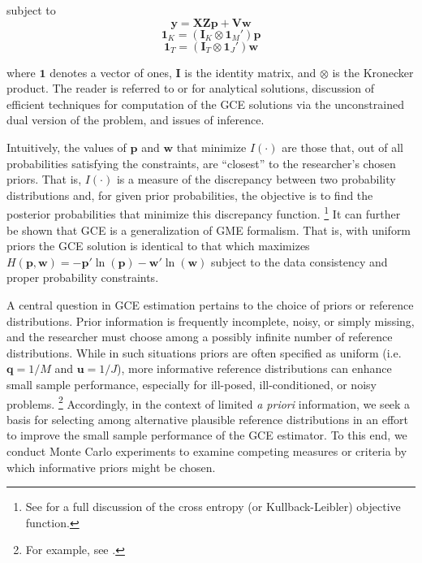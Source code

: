 \documentclass[english]{article}
\begin{document}
\noindent
subject to
\begin{equation}
\mathbf{y} = \mathbf{X Z p} 
+ \mathbf{V w}
\label{eq: glm}
\end{equation}
\begin{equation}
\mathbf{1}_K = (\mathbf{I}_K \otimes \mathbf{1}_M')\mathbf{p}
\label{eq: pp1}
\end{equation}
\begin{equation}
\mathbf{1}_T = (\mathbf{I}_T \otimes \mathbf{1}_J')\mathbf{w}
\label{eq: pp2}
\end{equation}

\noindent
where $\mathbf{1}$ denotes a vector of ones, $\mathbf{I}$ is the 
identity matrix, and $\otimes$ is the Kronecker product.
The reader is referred to \citet[Chap.\ 6]{golan1996} or 
\citet[Chap.\ 6]{golan2008} for analytical solutions, discussion of 
efficient techniques for computation of the GCE solutions via the 
unconstrained dual version of the problem, and issues of inference. 

Intuitively, the values of $\mathbf{p}$ and $\mathbf{w}$ that minimize
$I(\cdot)$ are those that, out of all probabilities satisfying the constraints, 
are ``closest'' to the researcher's chosen priors.
That is, $I(\cdot)$ is a measure of the discrepancy between two probability 
distributions and, for given prior probabilities, the objective is to find the 
posterior probabilities that minimize this discrepancy function.%
\footnote{See \citet[Chap.\ 6]{judge2011} for a full discussion of the 
cross entropy (or Kullback-Leibler) objective function.}
It can further be shown that GCE is a generalization of GME formalism.
That is, with uniform priors the GCE solution is identical to that which 
maximizes $H(\mathbf{p},\mathbf{w}) = - \mathbf{p}' \ln 
(\mathbf{p}) - \mathbf{w}' \ln (\mathbf{w})$ subject to the data
consistency and proper probability constraints. 

A central question in GCE estimation pertains to the choice of 
priors or reference distributions.
Prior information is frequently incomplete, noisy, or simply missing, and 
the researcher must choose among a possibly infinite number of 
reference distributions. 
While in such situations priors are often specified as uniform (i.e.\ 
$\mathbf{q}=1/M$ and $\mathbf{u}=1/J$), more informative 
reference distributions can enhance small sample performance, especially 
for ill-posed, ill-conditioned, or noisy problems.%
\footnote{For example, see \citet{heckelei2003}.}
Accordingly, in the context of limited \textit{a priori} information, 
we seek a basis for selecting among alternative plausible reference 
distributions in an effort to improve the small sample performance of 
the GCE estimator. 
To this end, we conduct Monte Carlo experiments to examine competing
measures or criteria by which informative priors might be chosen.
\end{document}
